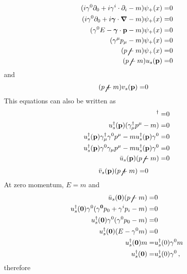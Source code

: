 \begin{frame}
\begin{align}
  \label{eq:144}
  (i\gamma^0\partial_0+i {\gamma}^i\cdot\partial_i-m)\psi_+(x)=&0\nonumber\\
  (i\gamma^0\partial_0+i \boldsymbol{\gamma}\cdot\boldsymbol{\nabla}-m)\psi_+(x)=&0\nonumber\\
  (\gamma^0E- \boldsymbol{\gamma}\cdot\mathbf{p}-m)\psi_+(x)=&0\nonumber\\
  (\gamma^\mu p_\mu-m)\psi_+(x)=&0\nonumber\\
  (\cancel{p}-m)\psi_+(x)=&0\nonumber\\
  (\cancel{p}-m)u_s(\mathbf{p})=&0
\end{align}
and
\begin{align}
  \label{eq:142}
   (\cancel{p}+m)v_s(\mathbf{p})=&0
\end{align}
This equations can also be written as
\begin{align}
   [(\cancel{p}-m)u_s(\mathbf{p})]^\dagger=&0\nonumber\\
   u_s^\dagger(\mathbf{p})(\gamma_\mu^\dagger p^\mu-m)=&0\nonumber\\
   u_s^\dagger(\mathbf{p})\gamma_\mu^\dagger\gamma^0p^\mu-m u_s^\dagger(\mathbf{p})\gamma^0=&0\nonumber\\
   u_s^\dagger(\mathbf{p})\gamma^0\gamma_\mu p^\mu-m u_s^\dagger(\mathbf{p})\gamma^0=&0\nonumber\\
   \bar{u}_s(\mathbf{p})(\cancel{p}-m)=&0
\end{align}
\begin{align}
\label{eq:143}
     \bar{v}_s(\mathbf{p})(\cancel{p}+m)=&0
\end{align}
At zero momentum, $E=m$ and
\begin{align*}
  \bar{u}_s(\mathbf{0})(\cancel{p}-m)=&0\nonumber\\
    {u}_s^\dagger(\mathbf{0}) \gamma^0(\gamma^\mathbf{0}p_0+\gamma^i{p_i}-m)=&0\nonumber\\
    {u}_s^\dagger(\mathbf{0}) \gamma^0(\gamma^0p_0-m)=&0\nonumber\\
    {u}_s^\dagger(\mathbf{0}) (E-\gamma^0 m)=&0\nonumber\\
    {u}_s^\dagger(\mathbf{0})m =&{u}_s^\dagger(0)\gamma^0 m\nonumber\\
    {u}_s^\dagger(\mathbf{0}) =&{u}_s^\dagger(0)\gamma^0\,,
\end{align*}
therefore


\end{frame}
